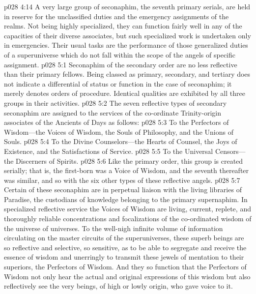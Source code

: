 \pc \vs p028 4:14 \bibnobreakspace {} A very large group of seconaphim, the seventh primary serials, are held in reserve for the unclassified duties and the emergency assignments of the realms. Not being highly specialized, they can function fairly well in any of the capacities of their diverse associates, but such specialized work is undertaken only in emergencies. Their usual tasks are the performance of those generalized duties of a superuniverse which do not fall within the scope of the angels of specific assignment.
\vs p028 5:1 Seconaphim of the secondary order are no less reflective than their primary fellows. Being classed as primary, secondary, and tertiary does not indicate a differential of status or function in the case of seconaphim; it merely denotes orders of procedure. Identical qualities are exhibited by all three groups in their activities.
\pc \vs p028 5:2 The seven reflective types of secondary seconaphim are assigned to the services of the co\hyp{}ordinate Trinity\hyp{}origin associates of the Ancients of Days as follows:\plusone
\vs p028 5:3 To the Perfectors of Wisdom---the Voices of Wisdom, the Souls of Philosophy, and the Unions of Souls.
\vs p028 5:4 To the Divine Counselors---the Hearts of Counsel, the Joys of Existence, and the Satisfactions of Service.
\vs p028 5:5 To the Universal Censors---the Discerners of Spirits.
\pc \vs p028 5:6 Like the primary order, this group is created serially; that is, the first\hyp{}born was a Voice of Wisdom, and the seventh thereafter was similar, and so with the six other types of these reflective angels.
\pc \vs p028 5:7 \bibnobreakspace {} Certain of these seconaphim are in perpetual liaison with the living libraries of Paradise, the custodians of knowledge belonging to the primary supernaphim. In specialized reflective service the Voices of Wisdom are living, current, replete, and thoroughly reliable concentrations and focalizations of the co\hyp{}ordinated wisdom of the universe of universes. To the well\hyp{}nigh infinite volume of information circulating on the master circuits of the superuniverses, these superb beings are so reflective and selective, so sensitive, as to be able to segregate and receive the essence of wisdom and unerringly to transmit these jewels of mentation to their superiors, the Perfectors of Wisdom. And they so function that the Perfectors of Wisdom not only hear the actual and original expressions of this wisdom but also reflectively see the very beings, of high or lowly origin, who gave voice to it.
